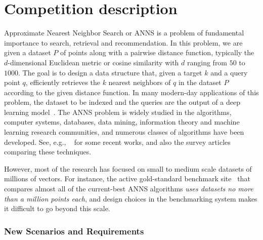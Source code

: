 
\section{Competition description}

Approximate Nearest Neighbor Search or ANNS is a problem of
fundamental importance to search, retrieval and recommendation.  In
this problem, we are given a dataset $P$ of points along with a
pairwise distance function, typically the $d$-dimensional Euclidean
metric or cosine similarity with $d$ ranging from $50$ to $1000$. The
goal is to design a data structure that, given a target $k$ and a
query point $q$, efficiently retrieves the $k$ nearest neighbors of 
$q$ in the dataset $P$ according to the given distance function. In
many modern-day applications of this problem, the dataset to be
indexed and the queries are the output of a deep learning
model~\citep{deep1b-link,BERT}.  The ANNS problem is widely studied in
the algorithms, computer systems, databases, data mining, information
theory and machine learning research communities, and numerous classes
of algorithms have been developed. See, e.g.,
~\citep{CoverTree,babenko2014additive,Faiss17,Weber98,ECCV18,HNSW16,PQ11,Arya93,Indyk98,onng,scann,puffinn}
for some recent works, and also the survey
articles~\citep{samet2006foundations, LSHSurvey08, LearningToHash18,
  GraphANNSSurvey21} comparing these techniques.

However, most of the research has focused on small to medium scale
datasets of millions of vectors. For instance, the active
gold-standard benchmark site~\citep{Benchmark} that compares almost all
of the current-best ANNS algorithms \emph{uses datasets no more than a
  million points each}, and design choices in the benchmarking system
makes it difficult to go beyond this scale.

\subsubsection{New Scenarios and Requirements}  \label{sec:scenarios}




